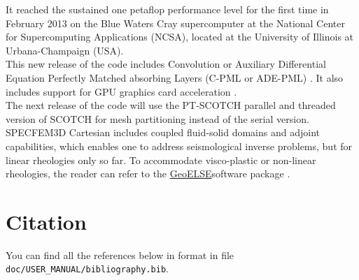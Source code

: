 It reached the sustained one petaflop performance level for the first time in February 2013
on the Blue Waters Cray supercomputer at the National Center for Supercomputing Applications (NCSA), located at the University of Illinois at Urbana-Champaign (USA).\\


This new release of the code includes Convolution or
Auxiliary Differential Equation Perfectly Matched absorbing Layers
(C-PML or ADE-PML) \citep{MaKoEz08,MaKoGe08,MaKo09,MaKoGeBr10,KoMa07}.
It also includes support for GPU graphics card acceleration \citep{Kom11,MiKo10,KoMiEr09,KoErGoMi10}.\\


The next release of the code will use the PT-SCOTCH parallel and threaded
version of SCOTCH for mesh partitioning instead of the serial version.\\


SPECFEM3D Cartesian includes coupled fluid-solid domains and adjoint
capabilities, which enables one to address seismological inverse problems,
but for linear rheologies only so far. To accommodate visco-plastic
or non-linear rheologies, the reader can refer to the \href{http://geoelse.stru.polimi.it/}{GeoELSE}software
package \citep{CaGa97,StPaIg09}.


\section{Citation}

You can find all the references below in \BibTeX format in file \texttt{doc/USER\_MANUAL/bibliography.bib}.\\

